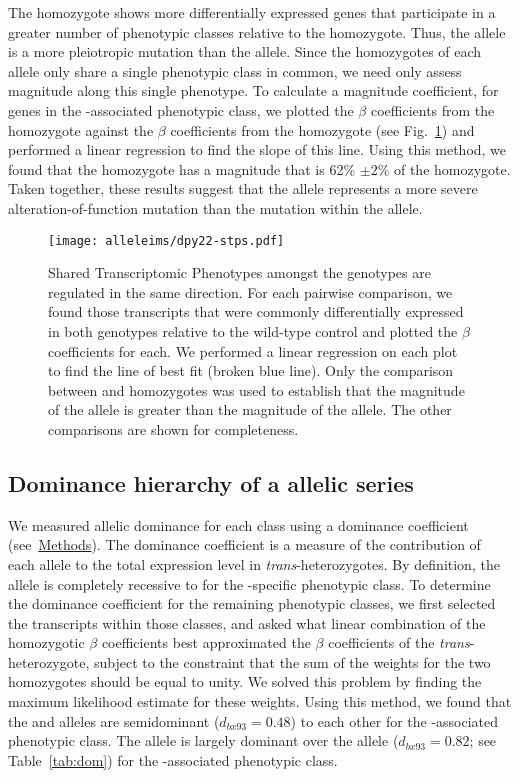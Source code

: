 The \sy{} homozygote shows more differentially expressed genes that participate
in a greater number of phenotypic classes relative to the \bx{} homozygote.
Thus, the \sy{} allele is a more pleiotropic mutation than the \bx{} allele.
Since the homozygotes of each allele only share a single phenotypic class in
common, we need only assess magnitude along this single phenotype. To calculate
a magnitude coefficient, for genes in the \bx{}-associated phenotypic class, we
plotted the $\beta$ coefficients from the \sy{} homozygote against the $\beta$
coefficients from the \bx{} homozygote (see Fig.~\ref{fig:stp}) and performed a
linear regression to find the slope of this line. Using this method, we found
that the \bx{} homozygote has a magnitude that is 62\% $\pm2\%$ of the \sy{}
homozygote. Taken together, these results suggest that the \sy{} allele
represents a more severe alteration-of-function mutation than the mutation
within the \bx{} allele.

\begin{figure}
  \centering
  \texttt{[image: alleleims/dpy22-stps.pdf]}
  \caption{
           Shared Transcriptomic Phenotypes amongst the \dpy{} genotypes are
           regulated in the same direction. For each pairwise comparison, we
           found those transcripts that were commonly differentially expressed
           in both genotypes relative to the wild-type control and plotted the
           $\beta$ coefficients for each. We performed a linear regression on
           each plot to find the line of best fit (broken blue line). Only the
           comparison between \sy{} and \bx{} homozygotes was used to establish
           that the magnitude of the \sy{} allele is greater than the magnitude
           of the \bx{} allele. The other comparisons are shown for
           completeness.
          }
\label{fig:stp}
\end{figure}

\subsection*{Dominance hierarchy of a  allelic series}
We measured allelic dominance for each class using a dominance coefficient
(see~\hyperref[sec:methods]{Methods}). The dominance coefficient is a measure of
the contribution of each allele to the total expression level in
\emph{trans}-heterozygotes. By definition, the \sy{} allele is completely
recessive to \bx{} for the \sy{}-specific phenotypic class. To determine the
dominance coefficient for the remaining phenotypic classes, we first selected
the transcripts within those classes, and asked what linear combination of the
homozygotic $\beta$ coefficients best approximated the $\beta$ coefficients of
the \emph{trans}-heterozygote, subject to the constraint that the sum of the
weights for the two homozygotes should be equal to unity. We solved this problem
by finding the maximum likelihood estimate for these weights. Using this method,
we found that the \sy{} and \bx{} alleles are semidominant ($d_{bx93} = 0.48$)
to each other for the \sy{}-associated phenotypic class. The \bx{} allele is
largely  dominant over the \sy{} allele ($d_{bx93}=0.82$; see
Table~\ref{tab:dom}) for the \bx{}-associated phenotypic class.

